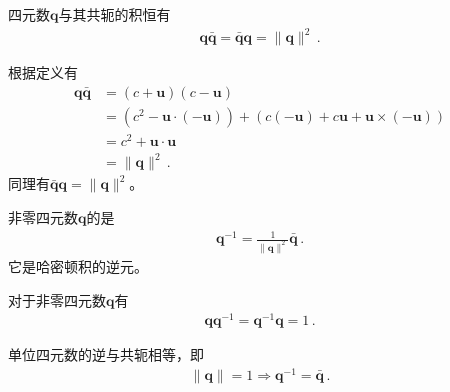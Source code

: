 \begin{proposition}
    四元数${\bm q}$与其共轭的积恒有
    \begin{align}
        {\bm q}\bar{\bm q}=\bar{\bm q}{\bm q}=\|{\bm q}\|^2\, .
    \end{align}
\end{proposition}
\begin{prove}
    根据定义有
    \begin{align}
        {\bm q}\bar{\bm q} & =(c+{\bm u})(c-{\bm u})\nonumber                                                      \\
                           & =(c^2-{\bm u}\cdot(-{\bm u}))+(c(-{\bm u})+c{\bm u}+{\bm u}\times(-{\bm u}))\nonumber \\
                           & =c^2+{\bm u}\cdot{\bm u}\nonumber                                                     \\
                           & =\|{\bm q}\|^2\, .
    \end{align}
    同理有$\bar{\bm q}{\bm q}=\|{\bm q}\|^2$。
\end{prove}
\begin{definition}
    非零四元数${\bm q}$的是
    \begin{align}
        {\bm q}^{-1}=\frac{1}{\|{\bm q}\|^2}\bar{\bm q}\, .
    \end{align}
    它是哈密顿积的逆元。
\end{definition}
\begin{corollary}
    对于非零四元数${\bm q}$有
    \begin{align}
        {\bm q}{\bm q}^{-1}={\bm q}^{-1}{\bm q}=1\, .
    \end{align}
\end{corollary}
\begin{corollary}
    单位四元数的逆与共轭相等，即
    \begin{align}
        \|{\bm q}\|=1 \Rightarrow {\bm q}^{-1}=\bar{\bm q}\, .
    \end{align}
\end{corollary}
